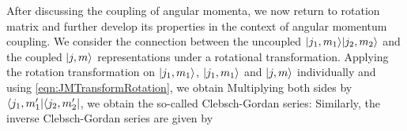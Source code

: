After discussing the coupling of angular momenta, we now return to rotation matrix and further develop its 
properties in the context of angular momentum coupling. We consider the connection between the uncoupled 
 $| j_1, m_1 \rangle| j_2, m_2 \rangle$ and the coupled $| j, m \rangle$ representations under a rotational transformation. 
Applying the rotation transformation on $| j_1, m_1 \rangle$, $| j_1, m_1 \rangle$ and $| j, m \rangle$ individually and using
\autoref{eqn:JMTransformRotation}, we obtain
Multiplying both sides by $\langle j_1, m_1^{\prime} |\langle j_2, m_2^{\prime}  |$, we obtain the so-called Clebsch-Gordan 
series:
Similarly, the inverse Clebsch-Gordan series are given by

